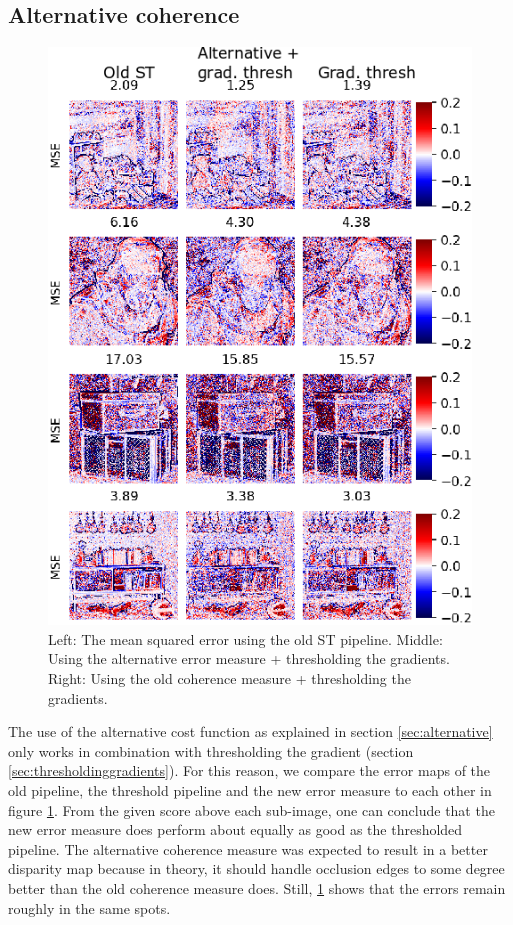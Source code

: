 \documentclass  [
  paper    = a4,
  BCOR     = 10mm,
  twoside,
  fontsize = 12pt,
  fleqn,
  toc      = bibnumbered,
  toc      = listofnumbered,
  numbers  = noendperiod,
  headings = normal,
  listof   = leveldown,
  version  = 3.03
]                                       {scrreprt}
\begin{document}
\subsection{Alternative coherence}
\label{sec:alternative_ev}
\begin{figure}[h!]
	\centering
	\includegraphics[width=0.7\linewidth]{images/thresh_vs_old_vs_newerror}
	\caption[Comparing alternative coherence to new coherence]{Left: The mean squared error using the old ST pipeline. Middle: Using the alternative error measure + thresholding the gradients. Right: Using the old coherence measure + thresholding the gradients.}
	\label{fig:threshvsoldvsnewerror}
\end{figure}
The use of the alternative cost function as explained in section \ref{sec:alternative} only works in combination with thresholding the gradient (section \ref{sec:thresholdinggradients}). For this reason, we compare the error maps of the old pipeline, the threshold pipeline and the new error measure to each other in figure \ref{fig:threshvsoldvsnewerror}.
From the given score above each sub-image, one can conclude that the new error measure does perform about equally as good as the thresholded pipeline. The alternative coherence measure was expected to result in a better disparity map because in theory, it should handle occlusion edges to some degree better than the old coherence measure does. Still, \ref{fig:threshvsoldvsnewerror} shows that the errors remain roughly in the same spots.
\end{document}
